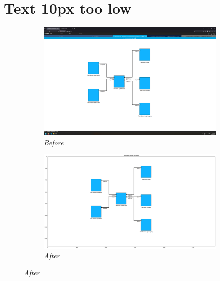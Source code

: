 \documentclass{article}
\begin{document}
\section{Text 10px too low}
\begin{figure}[H]
    \centering
    \begin{subfigure}[t]{0.9\textwidth}
        \centering
        \includegraphics[width=\textwidth]{testcases/text_10px_too_low/155426-766429_input_image.png}
        \caption*{\textit{Before}}
    \end{subfigure}
    \newline
    \begin{subfigure}[t]{0.9\textwidth}
        \centering
        \includegraphics[width=\textwidth]{testcases/text_10px_too_low/155439-414936_element_bbox_errors_labeled_colored.png}
        \caption*{\textit{After}}
    \end{subfigure}
    \label{fig:text_too_low_10}
\end{figure}
\newpage
\end{document}
